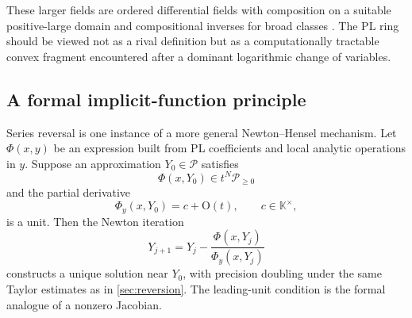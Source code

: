 \documentclass[11pt,oneside]{article}
\numberwithin{equation}{section}
\theoremstyle{definition}
\newcommand{\K}{\mathbb K}
\newcommand{\PL}{\mathscr P}
\newcommand{\bigO}{\mathrm{O}}
\begin{document}
These larger fields are ordered differential fields with composition on a
suitable positive-large domain and compositional inverses for broad classes
\cite{EdgarBeginners,EdgarComposition,VanDerHoeven2006}.  The PL ring should be
viewed not as a rival definition but as a computationally tractable convex
fragment encountered after a dominant logarithmic change of variables.

\begin{center}
\end{center}

\subsection{A formal implicit-function principle}

Series reversal is one instance of a more general Newton--Hensel mechanism.
Let \(\Phi(x,y)\) be an expression built from PL coefficients and local analytic
operations in \(y\).  Suppose an approximation \(Y_0\in\PL\) satisfies
\[
  \Phi(x,Y_0)\in t^N\PL_{\ge0}
\]
and the partial derivative
\[
  \Phi_y(x,Y_0)=c+\bigO(t),
  \qquad c\in\K^\times,
\]
is a unit.  Then the Newton iteration
\begin{equation}\label{eq:implicit-Newton}
  Y_{j+1}=Y_j-\frac{\Phi(x,Y_j)}{\Phi_y(x,Y_j)}
\end{equation}
constructs a unique solution near \(Y_0\), with precision doubling under the
same Taylor estimates as in \cref{sec:reversion}.  The leading-unit condition is
the formal analogue of a nonzero Jacobian.
\end{document}
